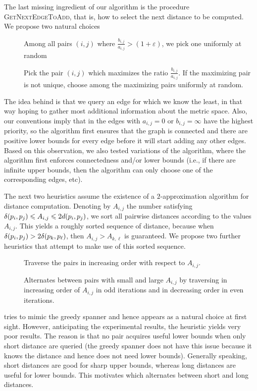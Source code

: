 \documentclass{ws-ijcga}
\renewcommand{\leq}{\leqslant}
\newcommand{\eps}{\varepsilon}
\begin{document}
%
The last missing ingredient of our algorithm is the procedure \textsc{GetNextEdgeToAdd},
that is, how to select the next distance to be computed. We propose two natural choices
%
\begin{description}
\item[\brndm] Among all pairs $(i,j)$ where $\frac{b_{i,j}}{a_{i,j}}>(1+\eps)$,
we pick one uniformly at random
\item[\bgrdy] Pick the pair $(i,j)$ which maximizes the ratio $\frac{b_{i,j}}{a_{i,j}}$.
If the maximizing pair is not unique, choose among the maximizing pairs uniformly at random.
\end{description}
%
The idea behind \bgrdy is that we query an edge for which we know the least,
in that way hoping to gather most additional information about the metric space.
Also, our conventions imply that in \bgrdy the edges with $a_{i,j} = 0$ or $b_{i,j} = \infty$
have the highest priority, so the algorithm first ensures that the graph is connected and there are positive
lower bounds for every edge before it will start adding any other edges. Based on this observation,
we also tested variations of the \brndm algorithm, where the algorithm
first enforces connectedness and/or lower bounds (i.e., if there are infinite upper bounds,
then the algorithm can only choose one of the corresponding edges, etc).


The next two heuristics assume the existence of a $2$-approximation algorithm for distance
computation. Denoting by $A_{i,j}$ the number satisfying $\dist(p_i,p_j)\leq A_{i,j}\leq 2 d(p_i,p_j)$,
we sort all pairwise distances according to the values $A_{i,j}$.
This yields a roughly sorted sequence of distance, because when $\delta(p_i,p_j)>2\delta(p_k,p_\ell)$,
then $A_{i,j}>A_{k,\ell}$ is guaranteed.
We propose two further heuristics that attempt to make use of this sorted sequence.
\begin{description}
\item [\bqsgrdy] Traverse the pairs in increasing order with respect to $A_{i,j}$.
\item [\bqsshaker] Alternates between pairs with small and large $A_{i,j}$
by traversing in increasing order of $A_{i,j}$ in odd iterations and in decreasing order
in even iterations.
\end{description}

\bqsgrdy tries to mimic the greedy spanner and hence appears as a natural
choice at first sight. However, anticipating the experimental results, the heuristic yields very poor
results. The reason is that no pair acquires useful lower bounds when only short distance are queried
(the greedy spanner does not have this issue because it knows the distance and hence does not need
lower bounds).
Generally speaking, short distances are good for sharp upper bounds, whereas long distances are
useful for lower bounds. This motivates \bqsshaker
which alternates between short and long distances.
\end{document}
